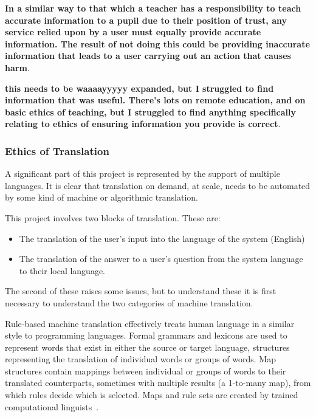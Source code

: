 \documentclass{article}
\begin{document}

{\bf In a similar way to that which a teacher has a responsibility to teach accurate information to a pupil due to their position of trust, any service relied upon by a user must equally provide accurate information.  The result of not doing this could be providing inaccurate information that leads to a user carrying out an action that causes harm}.



{\bf this needs to be waaaayyyyy expanded, but I struggled to find information that was useful.  There's lots on remote education, and on basic ethics of teaching, but I struggled to find anything specifically relating to ethics of ensuring information you provide is correct}.

\subsubsection{Ethics of Translation}
A significant part of this project is represented by the support of multiple languages.  It is clear that translation on demand, at scale, needs to be automated by some kind of machine or algorithmic translation.

This project involves two blocks of translation.  These are:
\begin{itemize}
  \item The translation of the user's input into the language of the system (English)
  \item The translation of the answer to a user's question from the system language to their local language.
\end{itemize}
The second of these raises some issues, but to understand these it is first necessary to understand the two categories of machine translation.

Rule-based machine translation effectively treats human language in a similar style to programming languages.  Formal grammars and lexicons are used to represent words that exist in either the source or target language, structures representing the translation of individual words or groups of words.  Map structures contain mappings between individual or groups of words to their translated counterparts, sometimes with multiple results (a 1-to-many map), from which rules decide which is selected.  Maps and rule sets are created by trained computational linguists~\cite{kenny2011ethics}.
\end{document}
